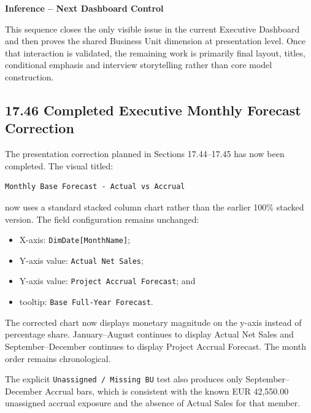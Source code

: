\documentclass[11pt,a4paper]{article}
\begin{document}
\begin{inferencebox}

\textbf{Inference -- Next Dashboard Control}

This sequence closes the only visible issue in the current Executive Dashboard
and then proves the shared Business Unit dimension at presentation level. Once
that interaction is validated, the remaining work is primarily final layout,
titles, conditional emphasis and interview storytelling rather than core model
construction.

\end{inferencebox}



\subsection{17.46 Completed Executive Monthly Forecast Correction}

The presentation correction planned in Sections 17.44--17.45 has now been
completed. The visual titled:

\begin{lstlisting}[style=powerquery]
Monthly Base Forecast - Actual vs Accrual
\end{lstlisting}

now uses a standard stacked column chart rather than the earlier 100\% stacked
version. The field configuration remains unchanged:

\begin{itemize}[leftmargin=7mm,itemsep=2pt]
    \item X-axis: \texttt{DimDate[MonthName]};
    \item Y-axis value: \texttt{Actual Net Sales};
    \item Y-axis value: \texttt{Project Accrual Forecast}; and
    \item tooltip: \texttt{Base Full-Year Forecast}.
\end{itemize}

The corrected chart now displays monetary magnitude on the y-axis instead of
percentage share. January--August continues to display Actual Net Sales and
September--December continues to display Project Accrual Forecast. The month
order remains chronological.

The explicit \texttt{Unassigned / Missing BU} test also produces only
September--December Accrual bars, which is consistent with the known
EUR 42,550.00 unassigned accrual exposure and the absence of Actual Sales for
that member.
\end{document}
